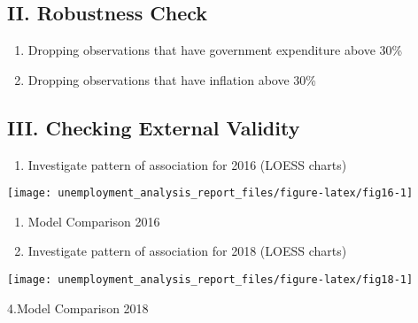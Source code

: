 \documentclass[
]{article}
\providecommand{\tightlist}{%
  \setlength{\itemsep}{0pt}\setlength{\parskip}{0pt}}
\begin{document}
\hypertarget{ii.-robustness-check}{%
\subsection{II. Robustness Check}\label{ii.-robustness-check}}

\begin{enumerate}
\def\labelenumi{\arabic{enumi}.}
\item
  Dropping observations that have government expenditure above 30\%
\item
  Dropping observations that have inflation above 30\%
\end{enumerate}

\hypertarget{iii.-checking-external-validity}{%
\subsection{III. Checking External
Validity}\label{iii.-checking-external-validity}}

\begin{enumerate}
\def\labelenumi{\arabic{enumi}.}
\tightlist
\item
  Investigate pattern of association for 2016 (LOESS charts)
\end{enumerate}

\begin{center}\texttt{[image: unemployment\_analysis\_report\_files/figure-latex/fig16-1]} \end{center}

\begin{enumerate}
\def\labelenumi{\arabic{enumi}.}
\setcounter{enumi}{1}
\item
  Model Comparison 2016
\item
  Investigate pattern of association for 2018 (LOESS charts)
\end{enumerate}

\begin{center}\texttt{[image: unemployment\_analysis\_report\_files/figure-latex/fig18-1]} \end{center}

4.Model Comparison 2018
\end{document}
